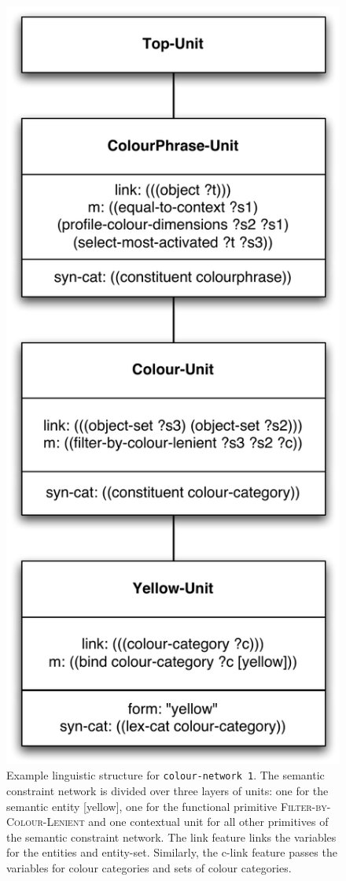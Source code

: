 \begin{figure}[htbp]
  \begin{center}
    \includegraphics[width=.5\textwidth]{./basic-strategy/figures/linguistic-structure.pdf}
    \caption[Example linguistic structure for basic colour
    strategy]{Example linguistic structure for \texttt{colour-network 1}. The semantic constraint network is divided over three
      layers of units: one for the semantic entity [yellow], one for
      the functional primitive \textsc{Filter-by-Colour-Lenient} and
      one contextual unit for all other primitives of the semantic
      constraint network. The link feature links the variables for the
      entities and entity-set. Similarly, the c-link feature passes
      the variables for colour categories and sets of colour
      categories.}
    \label{f:bcs-linguistic-structure}
  \end{center}
\end{figure}

